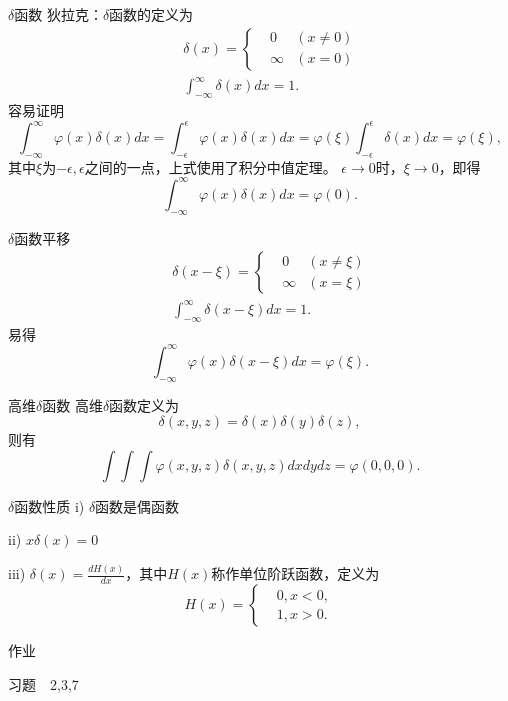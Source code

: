 \documentclass[11pt]{beamer}
\newcommand{\kong}[1][0.5]{\vspace{#1cm}}
\begin{document}
\begin{frame}{$\delta$函数}
狄拉克：$\delta$函数的定义为
\begin{eqnarray}
&&\delta(x) = \left\{
\begin{aligned}
&0      &(x\neq 0) \\
&\infty &(x=0)
\end{aligned}
\right. \\
&& \int^\infty_{-\infty} \delta(x) dx = 1.
\end{eqnarray}
容易证明
\begin{equation}
\int^\infty_{-\infty} \varphi(x) \delta(x) dx
= \int^\epsilon_{-\epsilon} \varphi(x) \delta(x) dx
= \varphi(\xi) \int^\epsilon_{-\epsilon} \delta(x) dx = \varphi(\xi),
\end{equation}
其中$\xi$为$-\epsilon,\epsilon$之间的一点，上式使用了积分中值定理。
$\epsilon \rightarrow 0$时，$\xi \rightarrow 0$，即得
\begin{equation}
\int^\infty_{-\infty} \varphi(x) \delta(x) dx = \varphi(0).
\end{equation}

\end{frame}

\begin{frame}{$\delta$函数平移}
\begin{eqnarray}
&&\delta(x - \xi) = \left\{
\begin{aligned}
&0      &(x\neq \xi) \\
&\infty &(x=\xi)
\end{aligned}
\right. \\
&& \int^\infty_{-\infty} \delta(x-\xi) dx = 1.
\end{eqnarray}
易得
\begin{equation}
\int^\infty_{-\infty} \varphi(x) \delta(x-\xi) dx = \varphi(\xi).
\end{equation}
\end{frame}

\begin{frame}{高维$\delta$函数}
高维$\delta$函数定义为
\begin{equation}
\delta(x,y,z) = \delta(x) \delta(y) \delta(z),
\end{equation}
则有
\begin{equation}
\int \int \int \varphi(x,y,z) \delta(x,y,z) dx dy dz = \varphi(0,0,0).
\end{equation}
\end{frame}

\begin{frame}{$\delta$函数性质}
i) $\delta$函数是偶函数

\kong[1]
ii) $x\delta(x) = 0$

\kong[1]
iii) $\delta(x) = \frac{d H(x)}{dx}$，其中$H(x)$称作单位阶跃函数，定义为
\begin{equation}
H(x) = \left\{
\begin{aligned}
&0, x<0, \\
&1, x>0.
\end{aligned}
\right.
\end{equation}

\end{frame}

\begin{frame}{作业}

\kong[1]

习题　2,3,7

\kong[1]

\end{frame}
\end{document}
